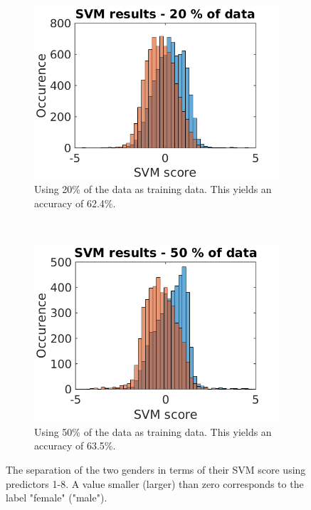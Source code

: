 \documentclass[a4paper,11pt]{article}
\begin{document}
\begin{figure}[h]
    \centering
    \begin{subfigure}[b]{0.45\textwidth}
        \includegraphics[width=\textwidth]{Pix/SVM_02_Score.png}
		\caption{Using 20\% of the data as training data. This yields an accuracy of 62.4\%.}
		\label{fig:SVM_02_score}
    \end{subfigure}
    ~
    \begin{subfigure}[b]{0.45\textwidth}
        \includegraphics[width=\textwidth]{Pix/SVM_05_Score.png}
		\caption{Using 50\% of the data as training data. This yields an accuracy of 63.5\%.}
		\label{fig:SVM_05_score}
    \end{subfigure}
    \caption{The separation of the two genders in terms of their SVM score using predictors 1-8. A value smaller (larger) than zero corresponds to the label "female" ("male").}
	\label{fig:SVM_Result}
\end{figure}
\FloatBarrier
\end{document}
